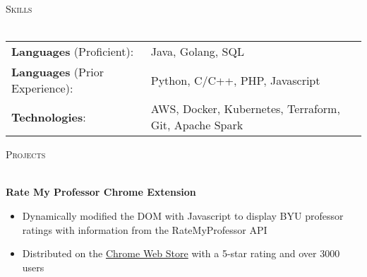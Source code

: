 \documentclass[letterpaper]{article}
\newcommand{\lineunder} {
    \vspace*{-8pt} \\
    \hspace*{-18pt} \hrulefill \\
}
\newcommand{\header} [1] {
    {\hspace*{-18pt}\vspace*{6pt} \textsc{#1}}
    \vspace*{-6pt} \lineunder
    \vspace{1mm}
}
\begin{document}
\header{Skills}

\begin{tabular}{ l l}
    \vspace{2mm}
	\textbf{Languages} (Proficient): & Java, Golang, SQL \\
    \vspace{2mm}
    \textbf{Languages} (Prior Experience):& Python, C/C++, PHP, Javascript \\
	\textbf{Technologies}: & AWS, Docker, Kubernetes, Terraform, Git, Apache Spark  \\
\end{tabular}
\vspace{2mm}

\header{Projects}

\textbf{Rate My Professor Chrome Extension} \\
\vspace{-1mm}
\begin{itemize} \itemsep 1pt
	\item Dynamically modified the DOM with Javascript to display BYU professor ratings with information from the RateMyProfessor API
	\item Distributed on the \href{https://chrome.google.com/webstore/detail/rate-my-byu-professors/ghokpcnkghnkfofadiajmmhinooijmaf}{Chrome Web Store} with a 5-star rating and over 3000 users
\end{itemize}
\vspace*{2mm}

\ 
\end{document}
